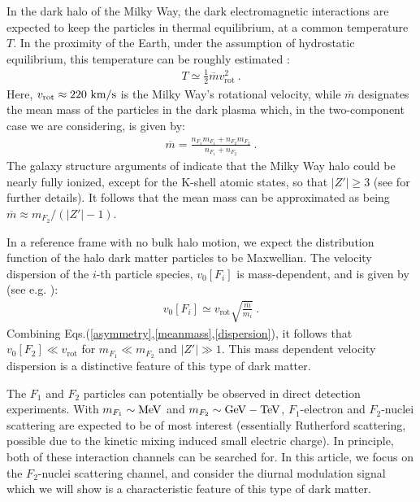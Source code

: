 \documentclass[12pt]{article}
\begin{document}
In the dark halo of the Milky Way,
the dark electromagnetic interactions are expected to keep the particles in thermal equilibrium, at a common temperature $T$. In the proximity of the Earth, under the assumption of hydrostatic equilibrium, this temperature can be roughly estimated \cite{hiddensector}:
%
\begin{eqnarray}
T \simeq \frac{1}{2}\overline{m}v _{\text{rot}} ^2 \ .
\end{eqnarray}
%
Here, $v _{\text{rot}} \approx 220 \ \rm km/s$ is the Milky Way's rotational velocity, while $\overline{m}$ designates the mean mass of the particles in the dark plasma which, in the two-component case we are considering, is given by:
%
\begin{eqnarray}
\overline{m} = \frac{n _{F_1}m _{F_1} + n _{F_2}m _{F_2}}{n _{F_1} + n _{F_2}} \ .
\label{meanmass}
\end{eqnarray}
%
The galaxy structure arguments of \cite{dhsdm} indicate that the Milky Way halo could be nearly fully ionized, except for the K-shell atomic states, so that $|Z'| \geq 3$ (see \cite{dhsdm} for further details). It follows that the mean mass can be approximated as being $\overline{m} \approx m _{F_2}/(|Z'|-1)$.

In a reference frame with no bulk halo motion, we expect the distribution function of the halo dark matter particles to be Maxwellian. The velocity dispersion of the $i$-th particle species, $v _0[F _i]$ is mass-dependent, and is given by (see e.g. \cite{hiddensector}):
%
\begin{eqnarray}
v _0[F _i] \simeq v _{\text{rot}}\sqrt{\frac{\overline{m}}{m _i}} \ .
\label{dispersion}
\end{eqnarray}
%
Combining Eqs.(\ref{asymmetry},\ref{meanmass},\ref{dispersion}), it follows that $v _0[F _2] \ll v _{\text{rot}}$ for $m _{F_1} \ll m _{F_2}$ and $|Z'| \gg 1$. This mass dependent velocity dispersion is a distinctive feature of this type of dark matter.

The $F_1$ and $F_2$ particles can potentially be observed in direct detection experiments. With $m _{F_1} \sim \rm MeV$ and $m _{F_2} \sim \rm GeV-TeV$, $F_1$-electron and $F_2$-nuclei scattering are expected to be of most interest (essentially Rutherford scattering, possible due to the kinetic mixing induced small electric charge). In principle, both of these interaction channels can be searched for. In this article, we focus on the $F_2$-nuclei scattering channel, and consider the diurnal modulation signal which we will show is a characteristic feature of this type of dark matter.
\end{document}
